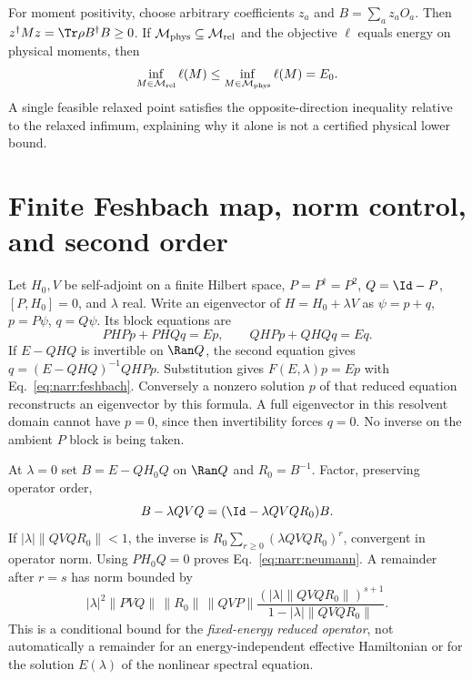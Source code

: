 For moment positivity, choose arbitrary coefficients $z_a$ and
$B=\sum_a z_aO_a$. Then $z^\dagger Mz=\Tr\rho B^\dagger B\geq0$.
If $\mathcal M_{\rm phys}\subseteq\mathcal M_{\rm rel}$ and the objective
$\ell$ equals energy on physical moments, then
\begin{equation}
 \inf_{M\in\mathcal M_{\rm rel}}\ell(M)
 \leq\inf_{M\in\mathcal M_{\rm phys}}\ell(M)=E_0.
\end{equation}
A single feasible relaxed point satisfies the opposite-direction inequality
relative to the relaxed infimum, explaining why it alone is not a certified
physical lower bound.

\section{Finite Feshbach map, norm control, and second order}
\label{app:feshbach_proof}
Let $H_0,V$ be self-adjoint on a finite Hilbert space, $P=P^\dagger=P^2$,
$Q=\Id-P$, $[P,H_0]=0$, and $\lambda$ real. Write an eigenvector of
$H=H_0+\lambda V$ as $\psi=p+q$, $p=P\psi$, $q=Q\psi$. Its block equations are
\begin{equation}
 PHPp+PHQq=Ep,\qquad QHPp+QHQq=Eq.
\end{equation}
If $E-QHQ$ is invertible on $\Ran Q$, the second equation gives
$q=(E-QHQ)^{-1}QHPp$. Substitution gives $F(E,\lambda)p=Ep$ with
Eq.~\eqref{eq:narr:feshbach}. Conversely a nonzero solution $p$ of that
reduced equation reconstructs an eigenvector by this formula. A full eigenvector
in this resolvent domain cannot have $p=0$, since then invertibility forces
$q=0$. No inverse on the ambient $P$ block is being taken.

At $\lambda=0$ set $B=E-QH_0Q$ on $\Ran Q$ and $R_0=B^{-1}$.
Factor, preserving operator order,
\begin{equation}
 B-\lambda QVQ=(\Id-\lambda QVQ R_0)B.
\end{equation}
If $|\lambda|\|QVQ R_0\|<1$, the inverse is
$R_0\sum_{r\geq0}(\lambda QVQ R_0)^r$, convergent in operator norm.
Using $PH_0Q=0$ proves Eq.~\eqref{eq:narr:neumann}. A remainder after $r=s$
has norm bounded by
\begin{equation}
 |\lambda|^2\|PVQ\|\,\|R_0\|\,\|QVP\|
 \frac{(|\lambda|\|QVQ R_0\|)^{s+1}}
      {1-|\lambda|\|QVQ R_0\|}.
\end{equation}
This is a conditional bound for the \emph{fixed-energy reduced operator},
not automatically a remainder for an energy-independent effective Hamiltonian
or for the solution $E(\lambda)$ of the nonlinear spectral equation.

